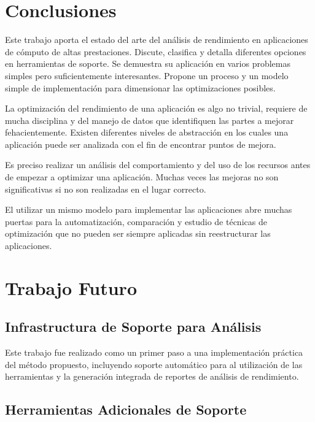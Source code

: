 \documentclass[a4paper]{report}
\begin{document}
\chapter{Conclusiones}

Este trabajo aporta el estado del arte del an\'alisis de rendimiento en
aplicaciones de c\'omputo de altas prestaciones. Discute, clasifica y detalla
diferentes opciones en herramientas de soporte. Se demuestra su aplicaci\'on
en varios problemas simples pero suficientemente interesantes. Propone un
proceso y un modelo simple de implementaci\'on para dimensionar las
optimizaciones posibles.

\bigskip

La optimizaci\'on del rendimiento de una aplicaci\'on es algo no trivial, requiere de mucha
disciplina y del manejo de datos que identifiquen las partes a mejorar fehacientemente.
Existen diferentes niveles de abstracci\'on en los cuales una aplicaci\'on puede ser analizada con el fin
de encontrar puntos de mejora. 

\bigskip

Es preciso realizar un an\'alisis del comportamiento y del uso de los recursos antes de
empezar a optimizar una aplicaci\'on. Muchas veces las mejoras no son significativas si no
son realizadas en el lugar correcto.

\bigskip

El utilizar un mismo modelo para implementar las aplicaciones abre muchas puertas para
la automatizaci\'on, comparaci\'on y estudio de t\'ecnicas de optimizaci\'on que no pueden
ser siempre aplicadas sin reestructurar las aplicaciones.

\chapter{Trabajo Futuro}

\section{Infrastructura de Soporte para An\'alisis}

Este trabajo fue realizado como un primer paso a una implementaci\'on pr\'actica del m\'etodo propuesto,
incluyendo soporte autom\'atico para al utilizaci\'on de las herramientas y la generaci\'on integrada de
reportes de an\'alisis de rendimiento.

\section{Herramientas Adicionales de Soporte}
\end{document}
